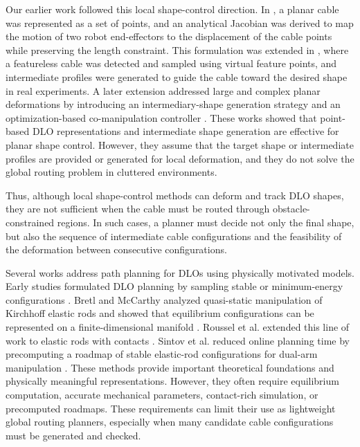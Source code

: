 \documentclass{pas}
\begin{document}
Our earlier work followed this local shape-control direction. In
\cite{AlmaghoutKlimchik2022PlanarShapeControl}, a planar cable was represented as a
set of points, and an analytical Jacobian was derived to map the motion of two
robot end-effectors to the displacement of the cable points while preserving the
length constraint. This formulation was extended in
\cite{AlmaghoutKlimchik2022VFP}, where a featureless cable was
detected and sampled using virtual feature points, and intermediate profiles were
generated to guide the cable toward the desired shape in real experiments. A
later extension addressed large and complex planar deformations by introducing
an intermediary-shape generation strategy and an optimization-based
co-manipulation controller \cite{AlmaghoutCherubiniKlimchik2024LargeDeformation}. These works
showed that point-based DLO representations and intermediate shape generation
are effective for planar shape control. However, they assume that the target
shape or intermediate profiles are provided or generated for local deformation,
and they do not solve the global routing problem in cluttered environments.

Thus, although local shape-control methods can deform and track DLO shapes,
they are not sufficient when the cable must be routed through obstacle-constrained
regions. In such cases, a planner must decide not only the final shape, but also
the sequence of intermediate cable configurations and the feasibility of the
deformation between consecutive configurations.

Several works address path planning for DLOs using physically motivated
models. Early studies formulated DLO planning by sampling stable or
minimum-energy configurations \cite{MollKavraki2006DLOPlanning}. Bretl and
McCarthy analyzed quasi-static manipulation of Kirchhoff elastic rods and
showed that equilibrium configurations can be represented on a finite-dimensional
manifold \cite{BretlMcCarthy2014ElasticRod}. Roussel et al. extended this line
of work to elastic rods with contacts \cite{RousselFernbachTaix2020ElasticRodContacts}.
Sintov et al. reduced online planning time by precomputing a roadmap of stable
elastic-rod configurations for dual-arm manipulation \cite{sintov2020motion}.
These methods provide important theoretical foundations and physically
meaningful representations. However, they often require equilibrium computation,
accurate mechanical parameters, contact-rich simulation, or precomputed
roadmaps. These requirements can limit their use as lightweight global routing
planners, especially when many candidate cable configurations must be generated
and checked.
\end{document}
